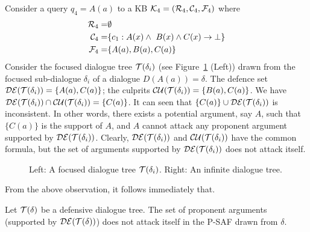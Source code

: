 \begin{example}
\label{ex:a-succ}
Consider a query $q_4 = A(a) $ to a KB $\mathcal{K}_4 = (\mathcal{R}_4, \mathcal{C}_4, \mathcal{F}_4)$ where 
\begin{align*}
    \mathcal{R}_4 = &\emptyset \\
    \mathcal{C}_4 = & \{c_1 : A(x) \land \ B(x) \land C(x) \rightarrow \bot \} \\
    \mathcal{F}_4 = & \{A(a), B(a) , C(a) \}
\end{align*}
Consider the focused dialogue tree $\mathcal{T}(\delta_i)$ (see Figure~\ref{fig:tree-ex} (Left)) drawn from the focused sub-dialogue $\delta_i$ of a dialogue $D(A(a)) = \delta$. The defence set $\mathcal{DE}(\mathcal{T}(\delta_i)) = \{A(a), C(a)\}$; the culprits $\mathcal{CU}(\mathcal{T}(\delta_i)) = \{B(a), C(a)\}$.
We have $\mathcal{DE}(\mathcal{T}(\delta_i)) \cap \mathcal{CU}(\mathcal{T}(\delta_i)) = \{C(a)\}$. It can seen that $\{C(a)\} \cup \mathcal{DE}(\mathcal{T}(\delta_i))$ is inconsistent. In other words, there exists a potential argument, say $A$, such that $\{C(a)\}$ is the support of $A$, and $A$ cannot attack any proponent argument supported by $\mathcal{DE}(\mathcal{T}(\delta_i))$. Clearly, $\mathcal{DE}(\mathcal{T}(\delta_i))$ and $\mathcal{CU}(\mathcal{T}(\delta_i))$ have the common formula, but the set of arguments supported by $\mathcal{DE}(\mathcal{T}(\delta_i))$ does not attack itself.
\end{example}

\begin{figure}
\centering
{}
\caption{
Left: A focused dialogue tree $\mathcal{T}(\delta_i)$.
Right: An infinite dialogue tree.
}
\label{fig:tree-ex}
\end{figure}



From the above observation, it follows immediately that.

\begin{lemma}
    Let $\mathcal{T}(\delta)$ be a defensive dialogue tree. The set of proponent arguments (supported by $\mathcal{DE}(\mathcal{T}(\delta))$) does not attack itself in the P-SAF drawn from $\delta$.
\end{lemma}


